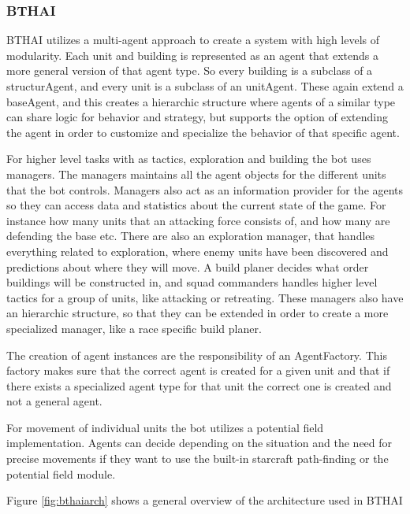 \subsubsection{BTHAI}
BTHAI utilizes a multi-agent approach to create a system with high levels of modularity. Each unit and building is represented as an agent that extends a more general version of that agent type. So every building is a subclass of a structurAgent, and every unit is a subclass of an unitAgent. These again extend a baseAgent, and this creates a hierarchic structure where agents of a similar type can share logic for behavior and strategy, but supports the option of extending the agent in order to customize and specialize the behavior of that specific agent. 

For higher level tasks with as tactics, exploration and building the bot uses managers. The managers maintains all the agent objects for the different units that the bot controls. Managers also act as an information provider for the agents so they can access data and statistics about the current state of the game. For instance how many units that an attacking force consists of, and how many are defending the base etc. 
There are also an exploration manager, that handles everything related to exploration, where enemy units have been discovered and predictions about where they will move. A build planer decides what order buildings will be constructed in, and squad commanders handles higher level tactics for a group of units, like attacking or retreating. These managers also have an hierarchic structure, so that they can be extended in order to create a more specialized manager, like a race specific build planer. 

The creation of agent instances are the responsibility of an AgentFactory. This factory makes sure that the correct agent is created for a given unit and that if there exists a specialized agent type for that unit the correct one is created and not a general agent. 

For movement of individual units the bot utilizes a potential field implementation. Agents can decide depending on the situation and the need for precise movements if they want to use the built-in starcraft path-finding or the potential field module. 

Figure \ref{fig:bthaiarch} shows a general overview of the architecture used in BTHAI


